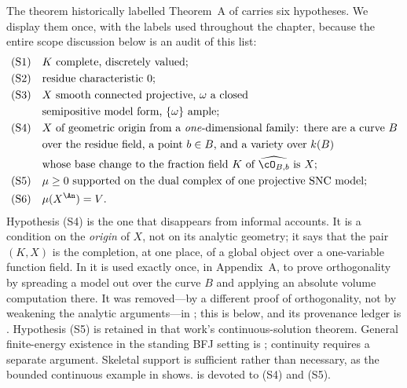 The theorem historically labelled Theorem~A of \cite{BFJ15} carries six
hypotheses.  We display them once, with the labels used throughout the
chapter, because the entire scope discussion below is an audit of this list:
\begin{equation}
\label{eq:ch29-signature}
\begin{aligned}
 \textup{(S1)}\quad&\text{$K$ complete, discretely valued;}\\
 \textup{(S2)}\quad&\text{residue characteristic $0$;}\\
 \textup{(S3)}\quad&\text{$X$ smooth connected projective, $\omega$ a closed}\\
 &\text{semipositive model form, $\{\omega\}$ ample;}\\
 \textup{(S4)}\quad&\text{$X$ of geometric origin from a
   \emph{one}-dimensional family: there are a curve $B$}\\
 &\text{over the residue field, a point $b\in B$, and a variety
   over $k(B)$}\\
 &\text{whose base change to the fraction field $K$ of
   $\widehat{\cO_{B,b}}$ is $X$;}\\
 \textup{(S5)}\quad&\text{$\mu\geq0$ supported on the dual complex of
   one projective SNC model;}\\
 \textup{(S6)}\quad&\text{$\mu(X^{\An})=V$.}
\end{aligned}
\end{equation}
Hypothesis \textup{(S4)} is the one that disappears from informal accounts.
It is a condition on the \emph{origin} of $X$, not on its analytic
geometry; it says that the pair $(K,X)$ is the completion, at one place,
of a global object over a one-variable function field.  In \cite{BFJ15} it
is used exactly once, in Appendix~A, to prove orthogonality by spreading a
model out over the curve $B$ and applying an absolute volume computation
there.  It was removed---by a different proof of orthogonality, not by
weakening the analytic arguments---in \cite{BGGJKM20}; this is
 below, and its provenance ledger
is .  Hypothesis \textup{(S5)} is retained in that work's continuous-solution
theorem.  General finite-energy existence in the standing BFJ setting is
; continuity requires a separate
argument.  Skeletal support is sufficient rather than necessary, as the
bounded continuous example in  shows.
 is devoted to \textup{(S4)} and \textup{(S5)}.

